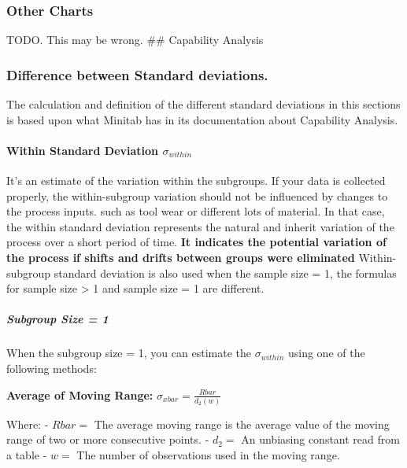 \documentclass[11pt]{article}
\begin{document}
\hypertarget{other-charts}{%
\subsubsection{Other Charts}\label{other-charts}}

    TODO. This may be wrong. \#\# Capability Analysis

\hypertarget{difference-between-standard-deviations.}{%
\subsubsection{Difference between Standard
deviations.}\label{difference-between-standard-deviations.}}

The calculation and definition of the different standard deviations in
this sections is based upon what Minitab has in its documentation about
Capability Analysis.

\hypertarget{within-standard-deviation-sigma_within}{%
\paragraph{\texorpdfstring{Within Standard Deviation
\(\sigma_{within}\)}{Within Standard Deviation \textbackslash sigma\_\{within\}}}\label{within-standard-deviation-sigma_within}}

It's an estimate of the variation within the subgroups. If your data is
collected properly, the within-subgroup variation should not be
influenced by changes to the process inputs. such as tool wear or
different lots of material. In that case, the within standard deviation
represents the natural and inherit variation of the process over a short
period of time. \textbf{It indicates the potential variation of the
process if shifts and drifts between groups were eliminated}
Within-subgroup standard deviation is also used when the sample size =
1, the formulas for sample size \textgreater{} 1 and sample size = 1 are
different.

\hypertarget{subgroup-size-1}{%
\subparagraph{Subgroup Size = 1}\label{subgroup-size-1}}

When the subgroup size = 1, you can estimate the \(\sigma_{within}\)
using one of the following methods:

\textbf{Average of Moving Range:}
\(\sigma_{xbar} = \frac{Rbar}{d_2(w)}\)

Where: - \(Rbar =\) The average moving range is the average value of the
moving range of two or more consecutive points. - \(d_2 =\) An unbiasing
constant read from a table - \(w =\) The number of observations used in
the moving range.
\end{document}
